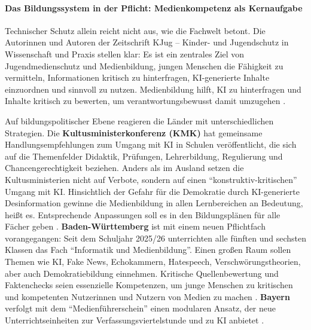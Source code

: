 \documentclass[12pt,a4paper]{article}
\begin{document}
	\paragraph{Das Bildungssystem in der Pflicht: Medienkompetenz als Kernaufgabe}
	Technischer Schutz allein reicht nicht aus, wie die Fachwelt betont. Die Autorinnen und Autoren der Zeitschrift KJug – Kinder- und Jugendschutz in Wissenschaft und Praxis stellen klar: Es ist ein zentrales Ziel von Jugendmedienschutz und Medienbildung, jungen Menschen die Fähigkeit zu vermitteln, Informationen kritisch zu hinterfragen, KI-generierte Inhalte einzuordnen und sinnvoll zu nutzen. Medienbildung hilft, KI zu hinterfragen und Inhalte kritisch zu bewerten, um verantwortungsbewusst damit umzugehen \cite{KJug2025}.
	
	Auf bildungspolitischer Ebene reagieren die Länder mit unterschiedlichen Strategien. Die \textbf{Kultusministerkonferenz (KMK)} hat gemeinsame Handlungsempfehlungen zum Umgang mit KI in Schulen veröffentlicht, die sich auf die Themenfelder Didaktik, Prüfungen, Lehrerbildung, Regulierung und Chancengerechtigkeit beziehen. Anders als im Ausland setzen die Kultusministerien nicht auf Verbote, sondern auf einen \enquote{konstruktiv-kritischen} Umgang mit KI. Hinsichtlich der Gefahr für die Demokratie durch KI-generierte Desinformation gewinne die Medienbildung in allen Lernbereichen an Bedeutung, heißt es. Entsprechende Anpassungen soll es in den Bildungsplänen für alle Fächer geben \cite{KMK2025}. \textbf{Baden-Württemberg} ist mit einem neuen Pflichtfach vorangegangen: Seit dem Schuljahr 2025/26 unterrichten alle fünften und sechsten Klassen das Fach \enquote{Informatik und Medienbildung}. Einen großen Raum sollen Themen wie KI, Fake News, Echokammern, Hatespeech, Verschwörungstheorien, aber auch Demokratiebildung einnehmen. Kritische Quellenbewertung und Faktenchecks seien essenzielle Kompetenzen, um junge Menschen zu kritischen und kompetenten Nutzerinnen und Nutzern von Medien zu machen \cite{BW2025}. \textbf{Bayern} verfolgt mit dem \enquote{Medienführerschein} einen modularen Ansatz, der neue Unterrichtseinheiten zur Verfassungsviertelstunde und zu KI anbietet \cite{Bayern2025}.
	
\end{document}
